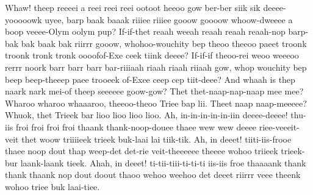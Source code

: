 \documentclass[12pt,a4paper]{article}
\begin{document}
\begin{drama}
\pistspeaks
Whaw! theep reeeei a reei reei reei ootoot heeoo gow ber-ber siik sik deeee-yooooowk uyee, barp baak baaak riiiee riiiee gooow goooow whoow-dweeee a boop veeee-Olym oolym pup?
\promspeaks
If-if-thet reaah weeah reaah reaah reaah-nop barp-bak bak baak bak riirrr gooow, whohoo-wouchity bep theoo theeoo paeet troonk troonk tronk tronk oooofof-Exe ceek tiink deeee? If-if-if theoo-rei weoo weeeoo rerrr noork barr barr barr bar-riiiaah riaah riaah riiaah gow, whop wouchity bep beep beep-theeep paee trooeek of-Exee ceep cep tiit-deee?
\pistspeaks
And whaah is thep naark nark mei-of theep seeeeee goow-gow?
\promspeaks
Thet thet-naap-nap-naap mee mee? Wharoo wharoo whaaaroo, theeoo-theoo Triee bap lii. Theet naap naap-meeeee? Whuok, thet Trieek bar lioo lioo lioo lioo.
\pistspeaks
Ah, in-in-in-in-in-iin deeee-deeee! thu-iis froi froi froi froi thaank thank-noop-douee thaee wew wew deeee riee-veeeit-veit thet woow triiiieek trieek buk-laai lai tiik-tik. Ah, in deeet! tiiti-iis-frooe thaee noop dout thap weep-det det-rie veit-theeeeee theeee wohoo triieek trieek-bur laank-laank tieek. Ahah, in deeet! ti-tii-tiii-ti-ti-ti iis-iis froe thaaaank thank thank thaank nop dout doout thaoo wehoo weehoo det deeet riirrr veee theenk wohoo triee buk laai-tiee.
\promspeaks

\end{drama}
\end{document}
